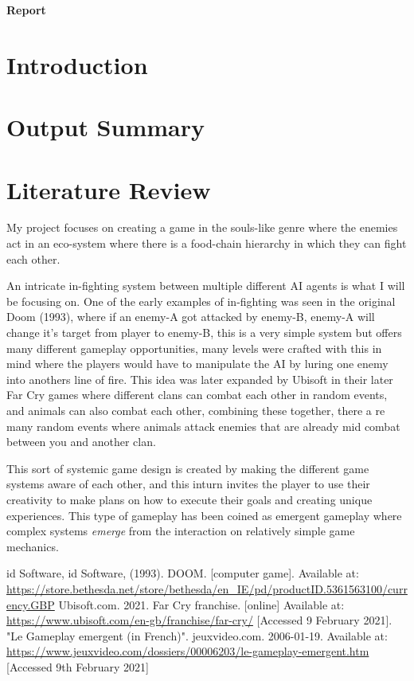 \documentclass[10pt]{report}
\begin{document}
\begin{titlepage}
\center
{\huge\bfseries Report}  
\end{titlepage}
\tableofcontents

\chapter{Introduction}
\chapter{Output Summary}
\chapter{Literature Review}
My project focuses on creating a game in the souls-like genre where the enemies act in an eco-system where there is a food-chain hierarchy in which they can fight each other.

An intricate in-fighting system between multiple different AI agents is what I will be focusing on. One of the early examples of in-fighting was seen in the original Doom (1993)\cite{doom93}, where if an enemy-A got attacked by enemy-B, enemy-A will change it's target from player to enemy-B, this is a very simple system but offers many different gameplay opportunities, many levels were crafted with this in mind where the players would have to manipulate the AI by luring one enemy into anothers line of fire.
This idea was later expanded by Ubisoft in their later Far Cry games where different clans can combat each other in random events, and animals can also combat each other, combining these together, there a re many random events where animals attack enemies that are already mid combat between you and another clan.

This sort of systemic game design is created by making the different game systems aware of each other, and this inturn invites the player to use their creativity to make plans on how to execute their goals and creating unique experiences. This type of gameplay has been coined as emergent gameplay where complex systems \textit{emerge} from the interaction on relatively simple game mechanics.\cite{emergentGameplay}


\begin{thebibliography}{}
    id Software, id Software, (1993). DOOM. [computer game]. Available at: \url{https://store.bethesda.net/store/bethesda/en_IE/pd/productID.5361563100/currency.GBP}
    Ubisoft.com. 2021. Far Cry franchise. [online] Available at: \url{https://www.ubisoft.com/en-gb/franchise/far-cry/} [Accessed 9 February 2021].
    "Le Gameplay emergent (in French)". jeuxvideo.com. 2006-01-19. Available at: \url{https://www.jeuxvideo.com/dossiers/00006203/le-gameplay-emergent.htm} [Accessed 9th February 2021]
    
\end{thebibliography}
\end{document}

